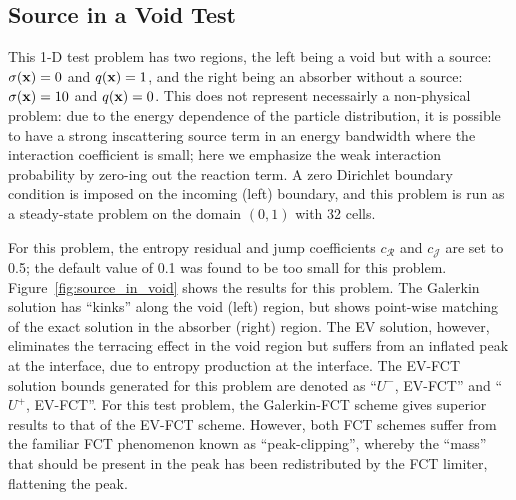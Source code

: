 \subsection{Source in a Void Test}
This 1-D test problem has two regions, the left being a void but with a source:
$\sigma(\mathbf{x})=0$ and $q(\mathbf{x})=1$, and the right being an absorber without a source:
$\sigma(\mathbf{x})=10$ and $q(\mathbf{x})=0$. This does not represent necessairly a non-physical problem:
due to the energy dependence of the particle distribution, it is possible to have
a strong inscattering source term in an energy bandwidth where the interaction coefficient is
small; here we emphasize the weak interaction probability by zero-ing out the reaction term.
A zero Dirichlet boundary condition is imposed on the incoming (left)
boundary, and this problem is run as a steady-state problem on the domain
$(0,1)$ with 32 cells.

For this problem, the entropy residual and jump coefficients $c_\mathcal{R}$
and $c_\mathcal{J}$ are set to 0.5; the default value of 0.1 was found
to be too small for this problem.
Figure~\ref{fig:source_in_void} shows the results for this problem.
The Galerkin solution has ``kinks'' along the void (left) region, but
shows point-wise matching of the exact solution in the absorber (right)
region. The EV solution, however, eliminates the terracing effect in
the void region but suffers from an inflated peak at the interface, due
to entropy production at the interface. The EV-FCT solution bounds generated for this
problem are denoted as ``$U^-$, EV-FCT'' and ``$U^+$, EV-FCT''. For this test problem, the
Galerkin-FCT scheme gives superior results to that of the EV-FCT
scheme. However, both FCT schemes suffer from the familiar FCT
phenomenon known as ``peak-clipping'', whereby the ``mass'' that
should be present in the peak has been redistributed by the FCT
limiter, flattening the peak.

